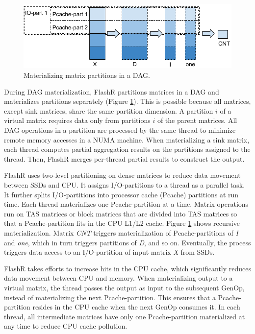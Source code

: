 \begin{figure}
	\centering
	\includegraphics[scale=0.6]{FlashMatrix_figs/materialize.pdf}
  \vspace{-4pt}
	\caption{Materializing matrix partitions in a DAG.}
	\label{fig:mater}
  \vspace{-8pt}
\end{figure}

During DAG materialization, FlashR partitions matrices in a DAG and
materializes partitions separately
(Figure \ref{fig:mater}). This is possible because all matrices, except
sink matrices, share the same partition dimension. 
A partition $i$ of a virtual matrix requires data only from partitions
$i$ of the parent matrices.  All DAG operations in a partition are processed by 
the same thread to minimize remote memory accesses in a NUMA machine.
When materializing a sink matrix, each thread computes partial
aggregation results on the partitions assigned to the thread. 
Then, FlashR merges per-thread partial results to construct the output.

FlashR uses two-level partitioning on dense matrices to reduce data
movement between SSDs and CPU. It assigns I/O-partitions to a thread as
a parallel task.
It further splits I/O-partitions into processor cache (Pcache)
partitions at run time.  Each thread materializes one Pcache-partition
at a time. Matrix operations run on TAS matrices or block matrices that are
divided into TAS matrices so that a Pcache-partition fits in the CPU L1/L2 cache.
Figure \ref{fig:mater} shows recursive materialization.
Matrix \textit{CNT} triggers materialization of
Pcache-partitions of \textit{I} and \textit{one}, which in turn triggers 
partitions of \textit{D}, and so on. Eventually, the process triggers data access
to an I/O-partition of input matrix \textit{X} from SSDs. 

FlashR takes efforts to increase hits in the CPU cache, which 
significantly reduces data movement between CPU and memory.
When materializing output to a virtual matrix, the thread passes
the output as input to the subsequent
GenOp, instead of materializing the next Pcache-partition.
This ensures that a Pcache-partition resides in the CPU cache
when the next GenOp consumes it. 
In each thread, all intermediate matrices have only one 
Pcache-partition materialized
at any time to reduce CPU cache pollution.

